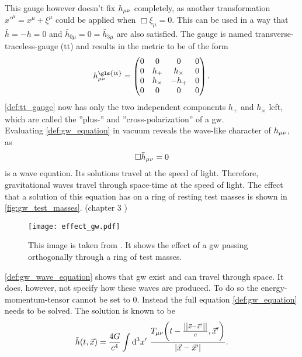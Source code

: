 This gauge however doesn't fix $h_{\mu\nu}$ completely, as another transformation ${x'}^\mu=x^\mu+\xi^\mu$ could be applied when $\Box\xi_\mu =0$. This can be used in a way that $\bar{h}=-h=0$ and $\bar{h}_{0\mu} = 0 = \bar{h}_{3\mu}$ are also satisfied. The gauge is named transverse-traceless-gauge (\gls{tt}) and results in the metric to be of the form
\begin{equation}\label{def:tt_gauge}
h_\mn^\text{\gls{tt}}=
\begin{pmatrix}
	0 & 0         & 0        & 0\\
	0 & h_+       & h_\times & 0\\
	0 & h_\times & -h_+      & 0\\
	0 & 0         & 0        & 0\\
\end{pmatrix}.
\end{equation}
\eqref{def:tt_gauge} now has only the two independent components $h_+$ and $h_\times$ left, which are called the ''plus-'' and ''cross-polarization'' of a \gls{gw}.\medskip\\
Evaluating \eqref{def:gw_equation} in vacuum reveals the wave-like character of $h_{\mu\nu}$, as
\begin{equation}\label{def:gw_wave_equation}
\Box\bar{h}_{\mu\nu} =0
\end{equation}
is a wave equation. Its solutions travel at the speed of light. Therefore, gravitational waves travel through space-time at the speed of light. The effect that a solution of this equation has on a ring of resting test masses is shown in \autoref{fig:gw_test_masses}. (chapter 3 \cite{bachelor})\medskip\\
\begin{figure}
\centering
\texttt{[image: effect\_gw.pdf]}
\caption[Effect of GW on ring of test masses]{This image is taken from \cite{bachelor}. It shows the effect of a \gls{gw} passing orthogonally through a ring of test masses.}\label{fig:gw_test_masses}
\end{figure}
\eqref{def:gw_wave_equation} shows that \gls{gw} exist and can travel through space. It does, however, not specify how these waves are produced. To do so the energy-momentum-tensor cannot be set to $0$. Instead the full equation \eqref{def:gw_equation} needs to be solved. The solution is known to be
\begin{equation}
\bar{h}\lr{t, \vec{x}}=\frac{4 G}{c^4}\int\Diff{3}x'\ \frac{T_\mn\lr{t-\frac{\norm{\vec{x}-\vec{x}'}}{c},\vec{x}'}}{\left|\vec{x}-\vec{x}'\right|}.
\end{equation}
